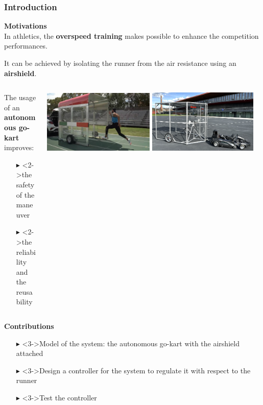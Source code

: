 \documentclass[10pt, aspectratio=169]{beamer}
\begin{document}
\begin{frame}[t]
\frametitle{Introduction}
\vspace{0.1cm}
\textcolor{emph@Thesis}{\textbf{\small{Motivations}}} \\
\vspace{0.3cm}
In athletics, the \textbf{overspeed training} makes possible to enhance the competition performances.

It can be achieved by isolating the runner from the air resistance using an \textbf{airshield}.

\begin{columns}
\hspace{0.2cm}
\begin{column}{0.48\textwidth}
\footnotesize
{}
The usage of an \textbf{autonomous go-kart} improves:
	\begin{itemize}
		\footnotesize
		\item[$\blacktriangleright$] <2->the safety of the maneuver
		\item[$\blacktriangleright$] <2->the reliability and the reusability 
	\end{itemize}
\end{column}
\begin{column}{0.52\textwidth}
	\begin{center}
  		\includegraphics[width=0.48\textwidth]{Jacobs} 
		\includegraphics[width=0.47\textwidth]{Windshield} 
	\end{center}
\end{column}
\end{columns}
\vspace{0.3cm}

 \textcolor{emph@Thesis}{\textbf{\small{Contributions}}} \\
\vspace{0.1cm}
\footnotesize
\begin{itemize}
	\footnotesize
	\item[$\blacktriangleright$] <3->Model of the system: the autonomous go-kart with the airshield attached
	\item[$\blacktriangleright$] <3->Design a controller for the system to regulate it with respect to the runner
	\item[$\blacktriangleright$] <3->Test the controller
\end{itemize}
\end{frame}
\end{document}
